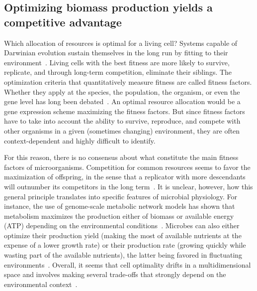 \subsection{Optimizing biomass production yields a competitive advantage}

Which allocation of resources is optimal for a living cell?
Systems capable of Darwinian evolution sustain themselves in the long run by fitting to their environment~\cite{dawkins_selfish_1976}.
Living cells with the best fitness are more likely to survive, replicate, and through long-term competition, eliminate their siblings.
The optimization criteria that quantitatively measure fitness are called fitness factors.
Whether they apply at the species, the population, the organism, or even the gene level has long been debated~\cite{dawkins_selfish_1976}.
An optimal resource allocation would be a gene expression scheme maximizing the fitness factors.
But since fitness factors have to take into account the ability to survive, reproduce, and compete with other organisms in a given (sometimes changing) environment, they are often context-dependent and highly difficult to identify.

For this reason, there is no consensus about what constitute the main fitness factors of microorganisms.
Competition for common resources seems to favor the maximization of offspring, in the sense that a replicator with more descendants will outnumber its competitors in the long term~\cite{dawkins_selfish_1976}.
It is unclear, however, how this general principle translates into specific features of microbial physiology.
For instance, the use of genome-scale metabolic network models has shown that metabolism maximizes the production either of biomass or available energy (ATP) depending on the environmental conditions~\cite{schuetz_systematic_2007}.
Microbes can also either optimize their production yield (making the most of available nutrients at the expense of a lower growth rate) or their production rate (growing quickly while wasting part of the available nutrients), the latter being favored in fluctuating environments~\cite{frank_tradeoff_2010,maclean_tragedy_2008,schuster_maximization_2008}.
Overall, it seems that cell optimality drifts in a multidimensional space and involves making several trade-offs that strongly depend on the environmental context~\cite{schuetz_multidimensional_2012}.

